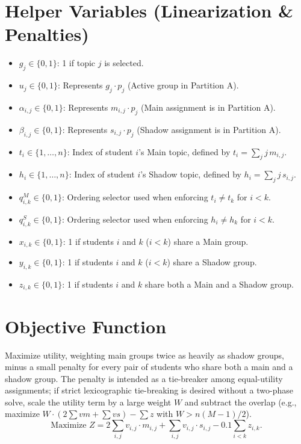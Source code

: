 \documentclass[12pt]{article}
\begin{document}
	\section{Helper Variables (Linearization \& Penalties)}
	\begin{itemize}
		\item $g_j \in \{0, 1\}$: 1 if topic $j$ is selected.
		\item $u_j \in \{0, 1\}$: Represents $g_j \cdot p_j$ (Active group in Partition A).
		\item $\alpha_{i,j} \in \{0, 1\}$: Represents $m_{i,j} \cdot p_j$ (Main assignment is in Partition A).
		\item $\beta_{i,j} \in \{0, 1\}$: Represents $s_{i,j} \cdot p_j$ (Shadow assignment is in Partition A).
		\item $t_i \in \{1,\dots,n\}$: Index of student $i$'s Main topic, defined by $t_i = \sum_j j\, m_{i,j}$.
		\item $h_i \in \{1,\dots,n\}$: Index of student $i$'s Shadow topic, defined by $h_i = \sum_j j\, s_{i,j}$.
		\item $q^M_{i,k} \in \{0, 1\}$: Ordering selector used when enforcing $t_i \ne t_k$ for $i<k$.
		\item $q^S_{i,k} \in \{0, 1\}$: Ordering selector used when enforcing $h_i \ne h_k$ for $i<k$.
		\item $x_{i,k} \in \{0, 1\}$: 1 if students $i$ and $k$ ($i < k$) share a Main group.
		\item $y_{i,k} \in \{0, 1\}$: 1 if students $i$ and $k$ ($i < k$) share a Shadow group.
		\item $z_{i,k} \in \{0, 1\}$: 1 if students $i$ and $k$ share both a Main and a Shadow group.
	\end{itemize}
	
	\section{Objective Function}
	Maximize utility, weighting main groups twice as heavily as shadow groups, minus a small penalty for every pair of students who share both a main and a shadow group. The penalty is intended as a tie-breaker among equal-utility assignments; if strict lexicographic tie-breaking is desired without a two-phase solve, scale the utility term by a large weight $W$ and subtract the overlap (e.g., maximize $W\cdot(2\sum v m + \sum v s) - \sum z$ with $W > n(M-1)/2$).
	\[
	\text{Maximize } Z = 2 \sum_{i,j} v_{i,j} \cdot m_{i,j} + \sum_{i,j} v_{i,j} \cdot s_{i,j}  - 0.1 \sum_{i<k} z_{i,k}.
	\]
	
\end{document}
